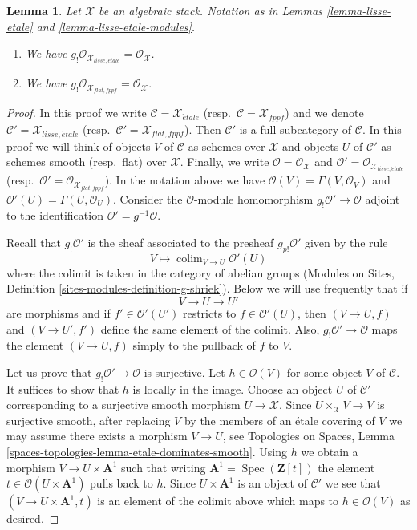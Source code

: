 \documentclass{stacks-project}
\theoremstyle{plain}
\newtheorem{lemma}[subsection]{Lemma}
\theoremstyle{definition}
\theoremstyle{remark}
\numberwithin{equation}{subsection}
\def\colim{\mathop{\mathrm{colim}}\nolimits}
\def\Spec{\mathop{\mathrm{Spec}}}
\def\etale{{\acute{e}tale}}
\begin{document}
\begin{lemma}
\label{lemma-lisse-etale-structure-sheaf}
Let $\mathcal{X}$ be an algebraic stack. Notation as in
Lemmas \ref{lemma-lisse-etale} and \ref{lemma-lisse-etale-modules}.
\begin{enumerate}
\item We have $g_!\mathcal{O}_{\mathcal{X}_{lisse,\etale}} =
\mathcal{O}_\mathcal{X}$.
\item We have $g_!\mathcal{O}_{\mathcal{X}_{flat, fppf}} =
\mathcal{O}_\mathcal{X}$.
\end{enumerate}
\end{lemma}

\begin{proof}
In this proof we write
$\mathcal{C} = \mathcal{X}_\etale$
(resp.\ $\mathcal{C} = \mathcal{X}_{fppf}$)
and we denote
$\mathcal{C}' = \mathcal{X}_{lisse,\etale}$
(resp.\ $\mathcal{C}' = \mathcal{X}_{flat, fppf}$).
Then $\mathcal{C}'$ is a full subcategory of $\mathcal{C}$.
In this proof we will think of objects $V$ of $\mathcal{C}$
as schemes over $\mathcal{X}$ and objects $U$ of $\mathcal{C}'$
as schemes smooth (resp.\ flat) over $\mathcal{X}$.
Finally, we write $\mathcal{O} = \mathcal{O}_\mathcal{X}$
and $\mathcal{O}' = \mathcal{O}_{\mathcal{X}_{lisse,\etale}}$
(resp.\ $\mathcal{O}' = \mathcal{O}_{\mathcal{X}_{flat,fppf}}$).
In the notation above we have $\mathcal{O}(V) = \Gamma(V, \mathcal{O}_V)$
and $\mathcal{O}'(U) = \Gamma(U, \mathcal{O}_U)$.
Consider the $\mathcal{O}$-module homomorphism
$g_!\mathcal{O}' \to \mathcal{O}$
adjoint to the identification $\mathcal{O}' = g^{-1}\mathcal{O}$.

\medskip\noindent
Recall that $g_!\mathcal{O}'$ is the sheaf associated to the presheaf
$g_{p!}\mathcal{O}'$ given by the rule
$$
V \longmapsto \colim_{V \to U} \mathcal{O}'(U)
$$
where the colimit is taken in the category of abelian groups
(Modules on Sites, Definition \ref{sites-modules-definition-g-shriek}).
Below we will use frequently that if
$$
V \to U \to U'
$$
are morphisms and if $f' \in \mathcal{O}'(U')$ restricts to
$f \in \mathcal{O}'(U)$, then $(V \to U, f)$ and $(V \to U', f')$
define the same element of the colimit. Also,
$g_!\mathcal{O}' \to \mathcal{O}$ maps the element
$(V \to U, f)$ simply to the pullback of $f$ to $V$.

\medskip\noindent
Let us prove that $g_!\mathcal{O}' \to \mathcal{O}$ is surjective.
Let $h \in \mathcal{O}(V)$ for some object $V$ of $\mathcal{C}$.
It suffices to show that $h$ is locally in the image. Choose an object
$U$ of $\mathcal{C}'$ corresponding to a surjective smooth morphism
$U \to \mathcal{X}$. Since $U \times_\mathcal{X} V \to V$ is surjective
smooth, after replacing $V$ by the members of an \'etale covering of $V$
we may assume there exists a morphism $V \to U$, see
Topologies on Spaces, Lemma
\ref{spaces-topologies-lemma-etale-dominates-smooth}. Using $h$ we obtain
a morphism $V \to U \times \mathbf{A}^1$ such that writing
$\mathbf{A}^1 = \Spec(\mathbf{Z}[t])$ the element
$t \in \mathcal{O}(U \times \mathbf{A}^1)$ pulls back to $h$.
Since $U \times \mathbf{A}^1$ is an object of $\mathcal{C}'$
we see that $(V \to U \times \mathbf{A}^1, t)$
is an element of the colimit above which maps to $h \in \mathcal{O}(V)$
as desired.


\end{proof}
\end{document}
